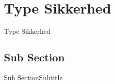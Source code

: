 \section{Type Sikkerhed}
\begin{frame}{Type Sikkerhed}

\end{frame}

\subsection{Sub Section}
\begin{frame}{Sub Section}{Subtitle}

\end{frame}